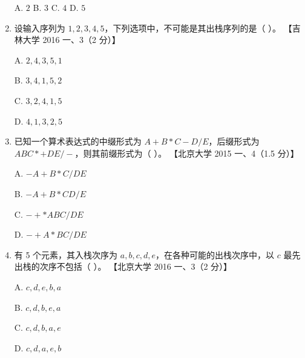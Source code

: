 \documentclass[lang=cn,newtx,10pt,scheme=chinese]{elegantbook}
\begin{document}
\begin{enumerate}
    A. $2$ \quad B. $3$ \quad C. $4$ \quad D. $5$  

    \item 设输入序列为 $1, 2, 3, 4, 5$，下列选项中，不可能是其出栈序列的是（ ）。  
    【吉林大学 2016 一、3（2 分）】  

    A. $2, 4, 3, 5, 1$  

    B. $3, 4,1,5,2$  

    C. $3, 2, 4, 1, 5$  

    D. $4,1,3,2,5$  

    \item 已知一个算术表达式的中缀形式为 $A + B * C - D / E$，后缀形式为 $A B C * + D E / -$，则其前缀形式为（ ）。  
    【北京大学 2015 一、4（1.5 分）】  

    A. $-A+B*C/DE$  

    B. $-A+B*CD/E$  

    C. $-+*ABC/DE$  

    D. $-+A*BC/DE$  

    \item 有 5 个元素，其入栈次序为 $a, b, c, d, e$，在各种可能的出栈次序中，以 $c$ 最先出栈的次序不包括（ ）。  
    【北京大学 2016 一、3（2 分）】  

    A. $c, d, e, b, a$  

    B. $c, d, b, e, a$  

    C. $c, d, b, a, e$  

    D. $c, d, a, e, b$  
\end{enumerate}
\end{document}
